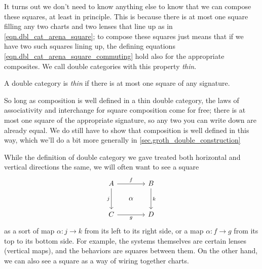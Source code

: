 \documentclass[DynamicalBook]{subfiles}
\begin{document}
It turns out we don't need to know anything else to know that we can compose
these squares, at least in principle. This is because there is at most one
square filling any two charts and two lenses that line up as in
\cref{eqn.dbl_cat_arena_square}; to compose these squares just means that if we
have two such squares lining up, the defining equations
\cref{eqn.dbl_cat_arena_square_commuting} hold also for the appropriate
composites. We call double categories with this property \emph{thin}.

\begin{definition}
  A double category is \emph{thin} if there is at most one square of any
  signature.
\end{definition}

So long as composition is well defined in a thin double category, the laws of
associativity and interchange for square composition come for free; there is at
most one square of the appropriate signature, so any two you can write down are
already equal. We do still have to show that composition is well defined in this
way, which we'll do a bit more generally in \cref{sec.groth_double_construction}

\begin{remark}\label{rmk.double_category_direction}
While the definition of double category we gave treated both horizontal and
vertical directions the same, we will often want to see a square
\[
  \begin{tikzcd}[sep=small]
    A \ar[dd, "j"'] \ar[rr, "f"] & & B \ar[dd, "k"] \\
    & \alpha & \\
    C \ar[rr, "g"'] & & D
  \end{tikzcd}
\]
as a sort of map $\alpha : j \to k$ from its left to its right side, or a map
$\alpha : f \to g$ from its top to its bottom side. For example, the systems
themselves are certain lenses (vertical maps), and the behaviors are squares
between them. On the other hand, we can also see a square as a way of wiring
together charts. 
\end{remark}
\end{document}
